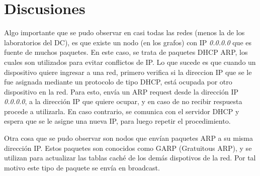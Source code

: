 \section{Discusiones}

Algo importante que se pudo observar en casi todas las redes (menos la de los laboratorios del DC), es que existe un nodo (en los grafos) con IP \textit{0.0.0.0} que es fuente de muchos paquetes. En este caso, se trata de paquetes DHCP ARP, los cuales son utilizados para evitar conflictos de IP. Lo que sucede es que cuando un dispositivo quiere ingresar a una red, primero verifica si la direccion IP que se le fue asignada mediante un protocolo de tipo DHCP, está ocupada por otro dispositivo en la red. Para esto, envía un ARP request desde la dirección IP \textit{0.0.0.0}, a la dirección IP que quiere ocupar, y en caso de no recibir respuesta procede a utilizarla. En caso contrario, se comunica con el servidor DHCP y espera que se le asigne una nueva IP, para luego repetir el procedimiento.

Otra cosa que se pudo observar son nodos que envían paquetes ARP a su misma dirección IP. Estos paquetes son conocidos como GARP (Gratuitous ARP), y se utilizan para actualizar las tablas caché de los demás dispotivos de la red. Por tal motivo este tipo de paquete se envía en broadcast.
